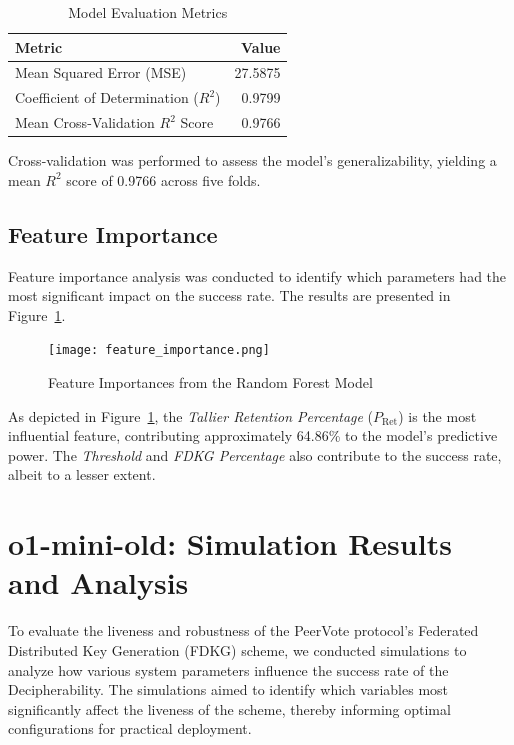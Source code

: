 \documentclass[runningheads]{llncs}
\begin{document}
\begin{table}[h]
    \centering
    \caption{Model Evaluation Metrics}
    \label{tab:model_metrics}
    \begin{tabular}{lr}
        \toprule
        \textbf{Metric} & \textbf{Value} \\
        \midrule
        Mean Squared Error (MSE) & 27.5875 \\
        Coefficient of Determination ($R^2$) & 0.9799 \\
        Mean Cross-Validation $R^2$ Score & 0.9766 \\
        \bottomrule
    \end{tabular}
\end{table}

Cross-validation was performed to assess the model's generalizability, yielding a mean $R^2$ score of 0.9766 across five folds.

\subsection{Feature Importance}

Feature importance analysis was conducted to identify which parameters had the most significant impact on the success rate. The results are presented in Figure~\ref{fig:feature_importance}.

\begin{figure}[h]
    \centering
    \texttt{[image: feature\_importance.png]}
    \caption{Feature Importances from the Random Forest Model}
    \label{fig:feature_importance}
\end{figure}

As depicted in Figure~\ref{fig:feature_importance}, the \textit{Tallier Retention Percentage} ($P_{\text{Ret}}$) is the most influential feature, contributing approximately 64.86\% to the model's predictive power. The \textit{Threshold} and \textit{FDKG Percentage} also contribute to the success rate, albeit to a lesser extent.

\section{o1-mini-old: Simulation Results and Analysis} \label{sec:simulation}

To evaluate the liveness and robustness of the PeerVote protocol's Federated Distributed Key Generation (FDKG) scheme, we conducted simulations to analyze how various system parameters influence the success rate of the Decipherability. The simulations aimed to identify which variables most significantly affect the liveness of the scheme, thereby informing optimal configurations for practical deployment.
\end{document}

